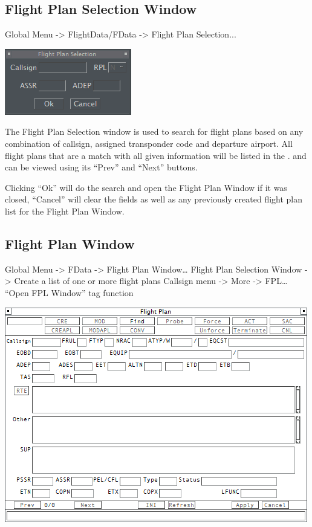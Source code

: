 \documentclass[11pt,a4paper,oldfontcommands]{memoir}
\begin{document}
\subsection{Flight Plan Selection Window}
\label{win:fpsw}

Global Menu -> FlightData/FData -> Flight Plan Selection...

\includegraphics{img/fpsel.png}

The Flight Plan Selection window is used to search for flight plans based on any combination of callsign, assigned transponder code and departure airport. All flight plans that are a match with all given information will be listed in the \textit{}. and can be viewed using its “Prev” and “Next” buttons.

Clicking “Ok” will do the search and open the Flight Plan Window if it was closed, “Cancel” will clear the fields as well as any previously created flight plan list for the Flight Plan Window.

\subsection{Flight Plan Window}
\label{win:fpw}

Global Menu -> FData -> Flight Plan Window… 
Flight Plan Selection Window -> Create a list of one or more flight plans 
Callsign menu -> More -> FPL… 
“Open FPL Window” tag function

\includegraphics{img/fpl.png}
\end{document}
